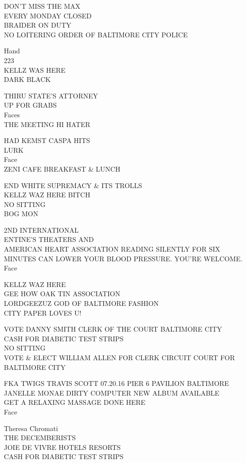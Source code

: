 \documentclass[10pt,letterpaper]{article}
\begin{document}
DON'T MISS THE MAX\\
EVERY MONDAY CLOSED\\
BRAIDER ON DUTY\\
NO LOITERING ORDER OF BALTIMORE CITY POLICE

Hand\\
223\\
KELLZ WAS HERE\\
DARK BLACK

THIRU STATE'S ATTORNEY\\
UP FOR GRABS\\
Faces\\
THE MEETING HI HATER

HAD KEMST CASPA HITS\\
LURK\\
Face\\
ZENI CAFE BREAKFAST \& LUNCH

END WHITE SUPREMACY \& ITS TROLLS\\
KELLZ WAZ HERE BITCH\\
NO SITTING\\
BOG MON

2ND INTERNATIONAL\\
ENTINE'S THEATERS AND\\
AMERICAN HEART ASSOCIATION READING SILENTLY FOR SIX MINUTES CAN LOWER YOUR BLOOD PRESSURE.  YOU'RE WELCOME.\\
Face

KELLZ WAZ HERE\\
GEE HOW OAK TIN ASSOCIATION\\
LORDGEEZUZ GOD OF BALTIMORE FASHION\\
CITY PAPER LOVES U!

VOTE DANNY SMITH CLERK OF THE COURT BALTIMORE CITY\\
CASH FOR DIABETIC TEST STRIPS\\
NO SITTING\\
VOTE \& ELECT WILLIAM ALLEN FOR CLERK CIRCUIT COURT FOR BALTIMORE CITY

FKA TWIGS TRAVIS SCOTT 07.20.16 PIER 6 PAVILION BALTIMORE\\
JANELLE MONAE DIRTY COMPUTER NEW ALBUM AVAILABLE\\
GET A RELAXING MASSAGE DONE HERE\\
Face

Theresa Chromati\\
THE DECEMBERISTS\\
JOIE DE VIVRE HOTELS RESORTS\\
CASH FOR DIABETIC TEST STRIPS
\end{document}
